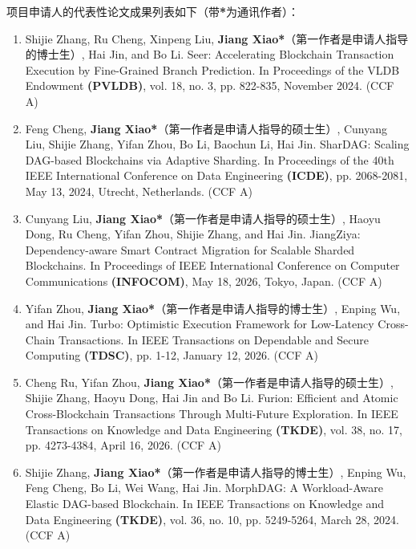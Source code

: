 \vspace{0.3cm}
{\kaishu

项目申请人的代表性论文成果列表如下（带\textbf{*}为通讯作者）：

\begin{enumerate}[itemsep=0pt, topsep=0pt, parsep=0pt]
    \item Shijie Zhang, Ru Cheng, Xinpeng Liu, \textbf{Jiang Xiao*}（第一作者是申请人指导的博士生）, Hai Jin, and Bo Li. Seer: Accelerating Blockchain Transaction Execution by Fine-Grained Branch Prediction. In Proceedings of the VLDB Endowment \textbf{(PVLDB)}, vol. 18, no. 3, pp. 822-835, November 2024. (CCF A)

    \item Feng Cheng, \textbf{Jiang Xiao*}（第一作者是申请人指导的硕士生）, Cunyang Liu, Shijie Zhang, Yifan Zhou, Bo Li, Baochun Li, Hai Jin. SharDAG: Scaling DAG-based Blockchains via Adaptive Sharding. In Proceedings of the 40th IEEE International Conference on Data Engineering \textbf{(ICDE)}, pp. 2068-2081, May 13, 2024, Utrecht, Netherlands. (CCF A)

    \item Cunyang Liu, \textbf{Jiang Xiao*}（第一作者是申请人指导的硕士生）, Haoyu Dong, Ru Cheng, Yifan Zhou, Shijie Zhang, and Hai Jin. JiangZiya: Dependency-aware Smart Contract Migration for Scalable Sharded Blockchains. In Proceedings of IEEE International Conference on Computer Communications \textbf{(INFOCOM)}, May 18, 2026, Tokyo, Japan. (CCF A)

    \item Yifan Zhou, \textbf{Jiang Xiao*}（第一作者是申请人指导的博士生）, Enping Wu, and Hai Jin. Turbo: Optimistic Execution Framework for Low-Latency Cross-Chain Transactions. In IEEE Transactions on Dependable and Secure Computing \textbf{(TDSC)}, pp. 1-12, January 12, 2026. (CCF A)

    \item Cheng Ru, Yifan Zhou, \textbf{Jiang Xiao*}（第一作者是申请人指导的硕士生）, Shijie Zhang, Haoyu Dong, Hai Jin and Bo Li. Furion: Efficient and Atomic Cross-Blockchain Transactions Through Multi-Future Exploration. In IEEE Transactions on Knowledge and Data Engineering \textbf{(TKDE)}, vol. 38, no. 17, pp. 4273-4384, April 16, 2026. (CCF A)

    \item Shijie Zhang, \textbf{Jiang Xiao*}（第一作者是申请人指导的博士生）, Enping Wu, Feng Cheng, Bo Li, Wei Wang, Hai Jin. MorphDAG: A Workload-Aware Elastic DAG-based Blockchain. In IEEE Transactions on Knowledge and Data Engineering \textbf{(TKDE)}, vol. 36, no. 10, pp. 5249-5264, March 28, 2024. (CCF A)


\end{enumerate}}
